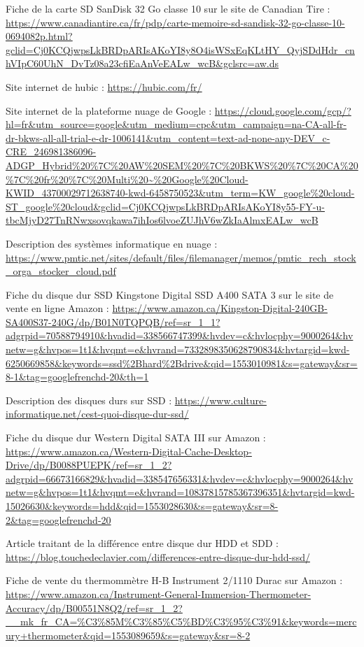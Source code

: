 \begin{thebibliographyUL}{9}
 Fiche de la carte SD SanDisk 32 Go classe 10 sur le site de Canadian Tire :
\url{https://www.canadiantire.ca/fr/pdp/carte-memoire-sd-sandisk-32-go-classe-10-0694082p.html?gclid=Cj0KCQjwpsLkBRDpARIsAKoYI8y8O4isWSxEqKLtHY_QyjSDdHdr_cnhVIpC60UhN_DvTz08a23cfiEaAnVeEALw_wcB&gclsrc=aw.ds}

 Site internet de hubic :
\url{https://hubic.com/fr/}

 Site internet de la plateforme nuage de Google :
\url{https://cloud.google.com/gcp/?hl=fr&utm_source=google&utm_medium=cpc&utm_campaign=na-CA-all-fr-dr-bkws-all-all-trial-e-dr-1006141&utm_content=text-ad-none-any-DEV_c-CRE_246981386096-ADGP_Hybrid\%20\%7C\%20AW\%20SEM\%20\%7C\%20BKWS\%20\%7C\%20CA\%20\%7C\%20fr\%20\%7C\%20Multi\%20~\%20Google\%20Cloud-KWID_43700029712638740-kwd-6458750523&utm_term=KW_google\%20cloud-ST_google\%20cloud&gclid=Cj0KCQjwpsLkBRDpARIsAKoYI8y55-FY-u-tbcMjyD27TnRNwxsovqkawa7ihIos6lvoeZUJhV6wZkIaAlmxEALw_wcB}

 Description des systèmes informatique en nuage :
\url{https://www.pmtic.net/sites/default/files/filemanager/memos/pmtic_rech_stock_orga_stocker_cloud.pdf}

Fiche du disque dur SSD Kingstone Digital SSD A400 SATA 3 sur le site de vente en ligne Amazon :
\url{https://www.amazon.ca/Kingston-Digital-240GB-SA400S37-240G/dp/B01N0TQPQB/ref=sr_1_1?adgrpid=70588794910&hvadid=338566747399&hvdev=c&hvlocphy=9000264&hvnetw=g&hvpos=1t1&hvqmt=e&hvrand=7332898350628790834&hvtargid=kwd-6250669858&keywords=ssd\%2Bhard\%2Bdrive&qid=1553010981&s=gateway&sr=8-1&tag=googlefrenchd-20&th=1}

 Description des disques durs sur SSD :
\url{https://www.culture-informatique.net/cest-quoi-disque-dur-ssd/}

 Fiche du disque dur Western Digital SATA III sur Amazon :
\url{https://www.amazon.ca/Western-Digital-Cache-Desktop-Drive/dp/B0088PUEPK/ref=sr_1_2?adgrpid=66673166829&hvadid=338547656331&hvdev=c&hvlocphy=9000264&hvnetw=g&hvpos=1t1&hvqmt=e&hvrand=10837815785367396351&hvtargid=kwd-15026630&keywords=hdd&qid=1553028630&s=gateway&sr=8-2&tag=googlefrenchd-20}

 Article traitant de la différence entre disque dur HDD et SDD :
\url{https://blog.touchedeclavier.com/differences-entre-disque-dur-hdd-ssd/}

 Fiche de vente du thermommètre H-B Instrument 2/1110 Durac sur Amazon :
\url{https://www.amazon.ca/Instrument-General-Immersion-Thermometer-Accuracy/dp/B00551N8Q2/ref=sr_1_2?__mk_fr_CA=\%C3\%85M\%C3\%85\%C5\%BD\%C3\%95\%C3\%91&keywords=mercury+thermometer&qid=1553089659&s=gateway&sr=8-2}


\end{thebibliographyUL}
